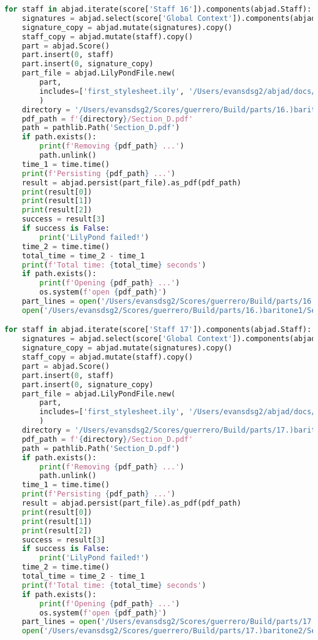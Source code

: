 \begin{lstlisting}[language=Python, caption=Invocation Source Code]
for staff in abjad.iterate(score['Staff 16']).components(abjad.Staff):
    signatures = abjad.select(score['Global Context']).components(abjad.Staff)
    signature_copy = abjad.mutate(signatures).copy()
    staff_copy = abjad.mutate(staff).copy()
    part = abjad.Score()
    part.insert(0, staff)
    part.insert(0, signature_copy)
    part_file = abjad.LilyPondFile.new(
        part,
        includes=['first_stylesheet.ily', '/Users/evansdsg2/abjad/docs/source/_stylesheets/abjad.ily'],
        )
    directory = '/Users/evansdsg2/Scores/guerrero/Build/parts/16.)baritone1'
    pdf_path = f'{directory}/Section_D.pdf'
    path = pathlib.Path('Section_D.pdf')
    if path.exists():
        print(f'Removing {pdf_path} ...')
        path.unlink()
    time_1 = time.time()
    print(f'Persisting {pdf_path} ...')
    result = abjad.persist(part_file).as_pdf(pdf_path)
    print(result[0])
    print(result[1])
    print(result[2])
    success = result[3]
    if success is False:
        print('LilyPond failed!')
    time_2 = time.time()
    total_time = time_2 - time_1
    print(f'Total time: {total_time} seconds')
    if path.exists():
        print(f'Opening {pdf_path} ...')
        os.system(f'open {pdf_path}')
    part_lines = open('/Users/evansdsg2/Scores/guerrero/Build/parts/16.)baritone1/Section_D.ly').readlines()
    open('/Users/evansdsg2/Scores/guerrero/Build/parts/16.)baritone1/Section_D.ly', 'w').writelines(part_lines[15:-1])

for staff in abjad.iterate(score['Staff 17']).components(abjad.Staff):
    signatures = abjad.select(score['Global Context']).components(abjad.Staff)
    signature_copy = abjad.mutate(signatures).copy()
    staff_copy = abjad.mutate(staff).copy()
    part = abjad.Score()
    part.insert(0, staff)
    part.insert(0, signature_copy)
    part_file = abjad.LilyPondFile.new(
        part,
        includes=['first_stylesheet.ily', '/Users/evansdsg2/abjad/docs/source/_stylesheets/abjad.ily'],
        )
    directory = '/Users/evansdsg2/Scores/guerrero/Build/parts/17.)baritone2'
    pdf_path = f'{directory}/Section_D.pdf'
    path = pathlib.Path('Section_D.pdf')
    if path.exists():
        print(f'Removing {pdf_path} ...')
        path.unlink()
    time_1 = time.time()
    print(f'Persisting {pdf_path} ...')
    result = abjad.persist(part_file).as_pdf(pdf_path)
    print(result[0])
    print(result[1])
    print(result[2])
    success = result[3]
    if success is False:
        print('LilyPond failed!')
    time_2 = time.time()
    total_time = time_2 - time_1
    print(f'Total time: {total_time} seconds')
    if path.exists():
        print(f'Opening {pdf_path} ...')
        os.system(f'open {pdf_path}')
    part_lines = open('/Users/evansdsg2/Scores/guerrero/Build/parts/17.)baritone2/Section_D.ly').readlines()
    open('/Users/evansdsg2/Scores/guerrero/Build/parts/17.)baritone2/Section_D.ly', 'w').writelines(part_lines[15:-1])


\end{lstlisting}
